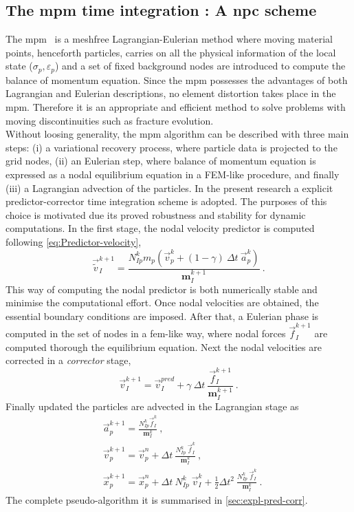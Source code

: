 \documentclass[preprint,12pt,a4paper]{elsarticle}
\newcommand{\tens}[1]{
  \ensuremath{\mathbf{{#1}}}
}
\begin{document}
\subsection{The \acrshort{mpm} time integration : A \acrlong{npc}  scheme}
\label{sec:2.1}
The \acrshort{mpm}~\cite{Sulsky1994} is a meshfree Lagrangian-Eulerian
method where moving material points, henceforth particles, carries on
all the physical information of the local state ($\sigma_p,
\varepsilon_p$) and a set of fixed background nodes are introduced to compute the balance of momentum equation. Since the \acrshort{mpm} 
possesses the advantages of both Lagrangian and Eulerian descriptions,
no element distortion takes place in the \acrshort{mpm}. Therefore it
is an appropriate and efficient method to solve problems with moving
discontinuities such as fracture evolution.\\
Without loosing generality, the \acrshort{mpm} algorithm
can be described with three main steps: (i) a variational recovery
process, where particle data is projected to the grid nodes, (ii) an
Eulerian step, where balance of momentum equation is expressed as a
nodal equilibrium equation in a FEM-like procedure, and finally
(iii) a Lagrangian advection of the particles. In the present research
a explicit predictor-corrector time integration scheme is adopted. The
purposes of this choice is motivated due its proved robustness and
stability for dynamic computations. In the first stage, the nodal
velocity predictor is computed following \eqref{eq:Predictor-velocity}, 
\begin{equation}
  \label{eq:Predictor-velocity}
  \vec{\tilde{v}}_I^{k+1} = \frac{ N_{Ip}^{k} m_p (\vec{v}_p^k + (1 - \gamma)\ \Delta t\ \vec{a}_p^k)}{\tens{m}_I^{k+1}}\ .
\end{equation}
This way of computing the nodal predictor is both numerically stable
and minimise the computational effort. Once nodal velocities are
obtained, the essential boundary conditions are imposed. After that, a
Eulerian phase is computed in the set of nodes in a
\acrshort{fem}-like way, where nodal forces $\vec{f}_{I}^{k+1}$ are
computed thorough the equilibrium equation. Next the nodal velocities
are corrected in a \textit{corrector} stage,
\begin{equation}
  \label{eq:Corrector-velocity}
  \vec{v}_{I}^{k+1} = \vec{v}_{I}^{pred} + \gamma\ \Delta t\
  \frac{\vec{f}_{I}^{k+1}}{\tens{m}_I^{k+1}}\ .
\end{equation}
Finally updated the particles are advected in the Lagrangian stage as
\begin{align}
  \label{eq:Update-lagrangian-pce}
        &\vec{a}_p^{k+1} =
          \frac{N_{Ip}^k\vec{f}_{I}^{k}}{\tens{m}_I^k}\ ,\\
      &\vec{v}_p^{k+1} = \vec{v}_p^n + \Delta t\
        \frac{N_{Ip}^k\
        \vec{f}_{I}^{k}}{\tens{m}_I^k}\ ,\\
      &\vec{x}_p^{k+1} = \vec{x}_p^n + \Delta t\
         N_{Ip}^k\ \vec{v}_{I}^{k} +
        \frac{1}{2}\Delta t^2\ \frac{N_{Ip}^k\
        \vec{f}_{I}^{k}}{\tens{m}_I^k}\ .
\end{align}
The complete pseudo-algorithm it is summarised in \ref{sec:expl-pred-corr}.
\end{document}

